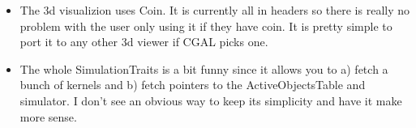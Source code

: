 \begin{itemize}
\item The 3d visualizion uses Coin. It is currently all in headers so
  there is really no problem with the user only using it if they have
  coin. It is pretty simple to port it to any other 3d viewer if CGAL
  picks one.

\item The whole SimulationTraits is a bit funny since it allows you to
  a) fetch a bunch of kernels and b) fetch pointers to the
  ActiveObjectsTable and simulator. I don't see an obvious way to keep
  its simplicity and have it make more sense.

\end{itemize}

